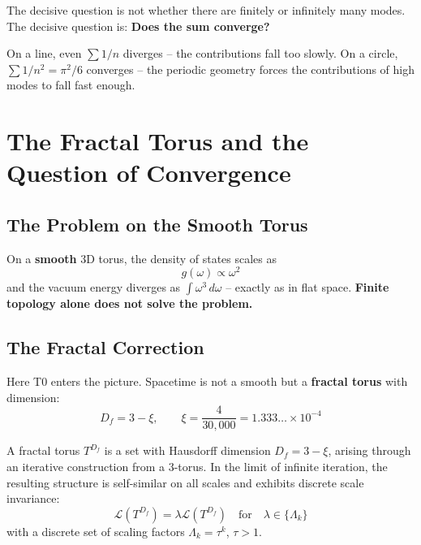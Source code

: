 	The decisive question is not whether there are finitely or infinitely many modes. The decisive question is: \textbf{Does the sum converge?}
	
	On a line, even $\sum 1/n$ diverges -- the contributions fall too slowly. On a circle, $\sum 1/n^2 = \pi^2/6$ converges -- the periodic geometry forces the contributions of high modes to fall fast enough.
	
	
	\section{The Fractal Torus and the Question of Convergence}
	
	\subsection{The Problem on the Smooth Torus}
	
	On a \textbf{smooth} 3D torus, the density of states scales as
	\begin{equation}
		g(\omega) \propto \omega^{2}
	\end{equation}
	and the vacuum energy diverges as $\int \omega^3 \, d\omega$ -- exactly as in flat space. \textbf{Finite topology alone does not solve the problem.}
	
	\subsection{The Fractal Correction}
	
	Here T0 enters the picture. Spacetime is not a smooth but a \textbf{fractal torus} with dimension:
	\begin{equation}
		D_f = 3 - \xi, \qquad \xi = \frac{4}{30{,}000} = 1.333\ldots \times 10^{-4}
	\end{equation}
	
	\begin{keypoint}
		A fractal torus $T^{D_f}$ is a set with Hausdorff dimension $D_f = 3 - \xi$, arising through an iterative construction from a 3-torus. In the limit of infinite iteration, the resulting structure is self-similar on all scales and exhibits discrete scale invariance:
		\begin{equation}
			\mathcal{L}(T^{D_f}) = \lambda \mathcal{L}(T^{D_f}) \quad \text{for} \quad \lambda \in \{\Lambda_k\}
		\end{equation}
		with a discrete set of scaling factors $\Lambda_k = \tau^k$, $\tau > 1$.
	\end{keypoint}
	
